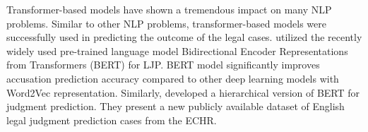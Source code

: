 \documentclass[sn-mathphys,Numbered]{sn-jnl}%
\theoremstyle{thmstyleone}%
\theoremstyle{thmstyletwo}%
\theoremstyle{thmstylethree}%
\begin{document}
Transformer-based models have shown a tremendous impact on many NLP problems. Similar to other NLP problems, transformer-based models were successfully used in predicting the outcome of the legal cases. \citet{wang2020deep} utilized the recently widely used pre-trained language model Bidirectional Encoder Representations from Transformers (BERT) for LJP. %
BERT model significantly improves accusation prediction accuracy compared to other   deep learning models with Word2Vec representation. %
Similarly, \citet{chalkidis2019neural} developed a hierarchical version of BERT for judgment prediction. They present a new publicly available dataset of English legal judgment prediction cases from the ECHR. %
\end{document}

